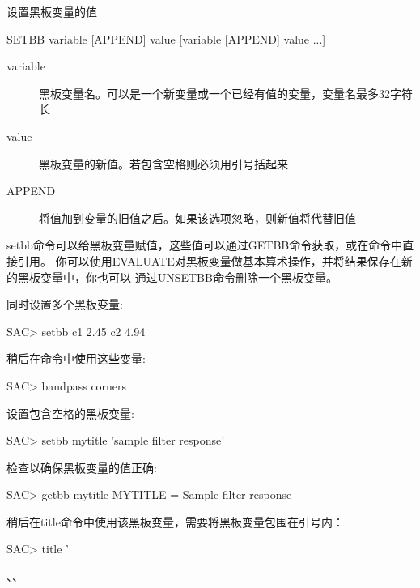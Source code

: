 \label{cmd:setbb}

设置黑板变量的值

\begin{SACSTX}
SETBB variable  [APPEND] value [variable [APPEND] value ...]
\end{SACSTX}

\begin{description}
\item [variable] 黑板变量名。可以是一个新变量或一个已经有值的变量，变量名最多32字符长
\item [value] 黑板变量的新值。若包含空格则必须用引号括起来
\item [APPEND] 将值加到变量的旧值之后。如果该选项忽略，则新值将代替旧值
\end{description}

setbb命令可以给黑板变量赋值，这些值可以通过GETBB命令获取，或在命令中直接引用。
你可以使用EVALUATE对黑板变量做基本算术操作，并将结果保存在新的黑板变量中，你也可以
通过UNSETBB命令删除一个黑板变量。

同时设置多个黑板变量:
\begin{SACCode}
SAC> setbb c1 2.45 c2 4.94
\end{SACCode}

稍后在命令中使用这些变量:
\begin{SACCode}
SAC> bandpass corners %
\end{SACCode}

设置包含空格的黑板变量:
\begin{SACCode}
SAC> setbb mytitle 'sample filter response'
\end{SACCode}

检查以确保黑板变量的值正确:
\begin{SACCode}
SAC> getbb mytitle
 MYTITLE = Sample filter response
\end{SACCode}

稍后在title命令中使用该黑板变量，需要将黑板变量包围在引号内：
\begin{SACCode}
SAC> title '%
\end{SACCode}

、、
